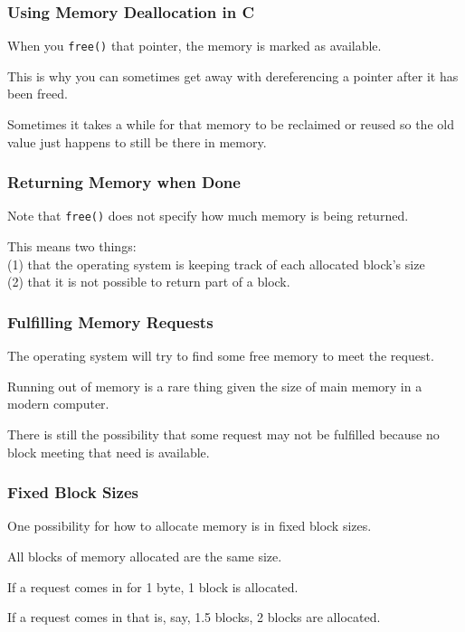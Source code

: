 \begin{frame}
\frametitle{Using Memory Deallocation in C}

When you \texttt{free()} that pointer, the memory is marked as available.

This is why you can sometimes get away with dereferencing a pointer after it has been freed. 

Sometimes it takes a while for that memory to be reclaimed or reused so the old value just happens to still be there in memory. 

\end{frame}

\begin{frame}
\frametitle{Returning Memory when Done}

Note that \texttt{free()} does not specify how much memory is being returned. 

This means two things:\\ 
\quad (1) that the operating system is keeping track of each allocated block's size\\
\quad (2) that it is not possible to return part of a block.



\end{frame}

\begin{frame}
\frametitle{Fulfilling Memory Requests}

The operating system will try to find some free memory to meet the request. 

Running out of memory is a rare thing given the size of main memory in a modern computer.

There is still the possibility that some request may not be fulfilled because no block meeting that need is available.

\end{frame}

\begin{frame}
\frametitle{Fixed Block Sizes}

One possibility for how to allocate memory is in fixed block sizes. 

All blocks of memory allocated are the same size. 

If a request comes in for 1 byte, 1 block is allocated. 

If a request comes in that is, say, 1.5 blocks, 2 blocks are allocated. 


\end{frame}

